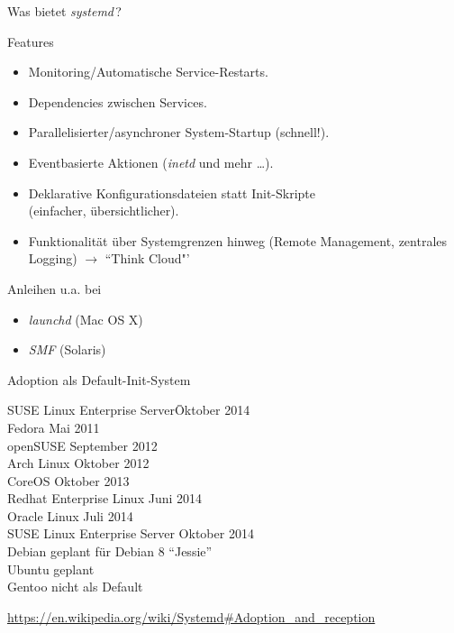 \begin{frame}{Was bietet \emph{systemd}\,?}
\begin{block}{Features}
\begin{itemize}
\item Monitoring/Automatische Service-Restarts.
\item Dependencies zwischen Services.
\item Parallelisierter/asynchroner System-Startup (schnell!).
\item Eventbasierte Aktionen (\emph{inetd} und mehr \dots).
\item Deklarative Konfigurationsdateien statt Init-Skripte\\ (einfacher,
übersichtlicher).
\item Funktionalität über Systemgrenzen hinweg (Remote Management,
zentrales Logging) $\rightarrow$ ``Think Cloud"'
\end{itemize}
\end{block}

\begin{block}{Anleihen u.a. bei}
\begin{itemize}
\item \emph{launchd} (Mac OS X)
\item \emph{SMF} (Solaris)
\end{itemize}
\end{block}
\end{frame}


\begin{frame}[fragile]{Adoption als Default-Init-System}
\begin{tabbing}
SUSE Linux Enterprise Server\quad \= Oktober 2014 \kill\\
Fedora \> Mai 2011 \\
openSUSE \> September 2012 \\
Arch Linux \> Oktober 2012 \\
CoreOS \> Oktober 2013 \\
Redhat Enterprise Linux \> Juni 2014 \\
Oracle Linux \> Juli 2014 \\
SUSE Linux Enterprise Server \> Oktober 2014 \\[1ex]
Debian \> geplant für Debian 8 ``Jessie'' \\
Ubuntu \> geplant \\[1ex]
Gentoo \> nicht als Default
\end{tabbing}
\vspace*{1ex}
\hfill{\footnotesize\url{https://en.wikipedia.org/wiki/Systemd#Adoption_and_reception}}
\end{frame}


